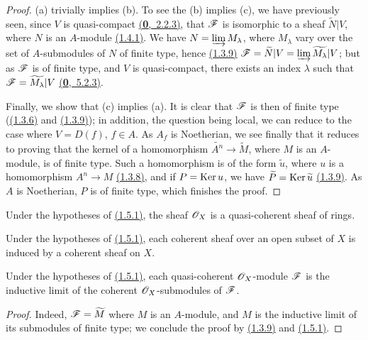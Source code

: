 \begin{proof}
\label{proof-thm-1.1.5.1}
(a) trivially implies (b). To see the (b) implies (c), we have previously seen, since $V$
is quasi-compact \hyperref[env-0.2.2.3]{(\textbf{0},~2.2.3)}, that $\mathscr{F}$ is isomorphic to a sheaf $\widetilde{N}|V$,
where $N$ is an $A$-module \hyperref[thm-1.1.4.1]{(1.4.1)}. We have $N=\varinjlim M_\lambda$, where
$M_\lambda$ vary over the set of $A$-submodules of $N$ of finite type, hence
\hyperref[cor-1.1.3.9]{(1.3.9)} $\mathscr{F}=\widetilde{N}|V=\varinjlim\widetilde{M_\lambda}|V$; but as $\mathscr{F}$
is of finite type, and $V$ is quasi-compact, there exists an index $\lambda$ such that
$\mathscr{F}=\widetilde{M_\lambda}|V$ \hyperref[env-0.5.2.3]{(\textbf{0},~5.2.3)}.

Finally, we show that (c) implies (a). It is clear that $\mathscr{F}$ is then of finite type
(\hyperref[prop-1.1.3.6]{(1.3.6)} and \hyperref[cor-1.1.3.9]{(1.3.9)}); in addition, the question being local, we can
reduce to the case where $V=D(f)$, $f\in A$. As $A_f$ is Noetherian, we see finally that it
reduces to proving that the kernel of a homomorphism $\widetilde{A^n}\to\widetilde{M}$, where
$M$ is an $A$-module, is of finite type. Such a homomorphism is of the form $\widetilde{u}$,
where $u$ is a homomorphism $A^n\to M$ \hyperref[cor-1.1.3.8]{(1.3.8)}, and if $P={\mathop{\mathrm{Ker}}\nolimits}\, u$, we have
$\widetilde{P}={\mathop{\mathrm{Ker}}\nolimits}\,\widetilde{u}$ \hyperref[cor-1.1.3.9]{(1.3.9)}. As $A$ is Noetherian, $P$ is of finite
type, which finishes the proof.
\end{proof}

\begin{cor}[1.5.2]
\label{cor-1.1.5.2}
Under the hypotheses of \hyperref[thm-1.1.5.1]{(1.5.1)}, the sheaf $\mathscr{O}_X$ is a quasi-coherent sheaf of
rings.
\end{cor}

\begin{cor}[1.5.3]
\label{cor-1.1.5.3}
Under the hypotheses of \hyperref[thm-1.1.5.1]{(1.5.1)}, each coherent sheaf over an open subset of $X$ is
induced by a coherent sheaf on $X$.
\end{cor}

\begin{cor}[1.5.4]
\label{cor-1.1.5.4}
Under the hypotheses of \hyperref[thm-1.1.5.1]{(1.5.1)}, each quasi-coherent $\mathscr{O}_X$-module $\mathscr{F}$ is
the inductive limit of the coherent $\mathscr{O}_X$-submodules of $\mathscr{F}$.
\end{cor}

\begin{proof}
\label{proof-cor-1.1.5.4}
Indeed, $\mathscr{F}=\widetilde{M}$ where $M$ is an $A$-module, and $M$ is the inductive limit of
its submodules of finite type; we conclude the proof by \hyperref[cor-1.1.3.9]{(1.3.9)} and
\hyperref[thm-1.1.5.1]{(1.5.1)}.
\end{proof}

